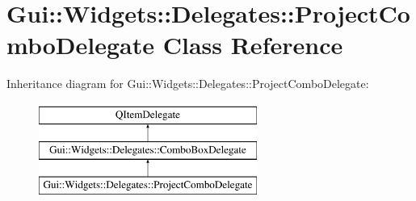\hypertarget{classGui_1_1Widgets_1_1Delegates_1_1ProjectComboDelegate}{\section{Gui\-:\-:Widgets\-:\-:Delegates\-:\-:Project\-Combo\-Delegate Class Reference}
\label{classGui_1_1Widgets_1_1Delegates_1_1ProjectComboDelegate}
}
Inheritance diagram for Gui\-:\-:Widgets\-:\-:Delegates\-:\-:Project\-Combo\-Delegate\-:\begin{figure}[H]
\begin{center}
\leavevmode
\includegraphics[height=3.000000cm]{d6/d93/classGui_1_1Widgets_1_1Delegates_1_1ProjectComboDelegate}
\end{center}
\end{figure}
